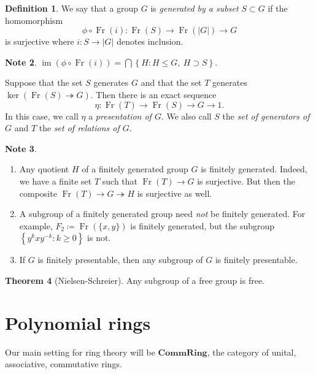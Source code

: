 \documentclass[10pt,letterpaper,cm]{nupset}
\theoremstyle{definition}
\newtheorem{definition}{Definition}[subsection]
\newtheorem{note}[definition]{Note}
\theoremstyle{theorem}
\newtheorem{theorem}[definition]{Theorem}
\theoremstyle{remark}
\newcommand{\1}{\mathbf{1}}
\newcommand{\0}{\vec 0}
\DeclareMathOperator{\im}{im}
\DeclareMathOperator{\Fr}{Fr}
\begin{document}
\begin{definition}
We say that a group $G$ is \textit{generated by a subset $S\subset G$} if the homomorphism $$\phi \circ \Fr(i):\Fr(S) \to \Fr(\lvert{G}\rvert) \to G$$ is surjective where $i: S \to \lvert{G}\rvert$ denotes inclusion.
\end{definition}

\begin{note}
$\im(\phi \circ \Fr(i)) = \bigcap{\left\{H : H \leq G, \ H \supset S\right\}}$.
\end{note}

\medskip

Suppose that the set $S$ generates $G$ and that the set $T$ generates $\ker(\Fr(S) \twoheadrightarrow G)$. Then there is an exact sequence $$\eta :  \Fr(T) \to \Fr(S) \to G \to 1.$$ In this case, we call $\eta$ a \textit{presentation of $G$}. We also call $S$ the \textit{set of generators of $G$} and $T$ the \textit{set of relations of $G$}.



\begin{note} $ $
\begin{enumerate}
\item Any quotient $H$ of a finitely generated group $G$ is finitely generated. Indeed, we have a finite set $T$ such that $\Fr(T) \to G$ is surjective. But then the composite $\Fr(T) \to G \twoheadrightarrow H$ is surjective as well.
\item A subgroup of a finitely generated group need \emph{not} be finitely generated. For example, $F_2\coloneqq \Fr(\{x,y\})$ is finitely generated, but the subgroup $\left\{y^kxy^{-k} : k \geq 0\right\}$ is not.
\item If $G$ is finitely presentable, then any subgroup of $G$ is finitely presentable.
\end{enumerate}  
\end{note}

\begin{theorem}[Nielsen-Schreier]
Any subgroup of a free group is free.
\end{theorem}

\section{Polynomial rings}


Our main setting for ring theory will be $\mathbf{CommRing}$, the category of unital, associative, commutative rings.

\medskip
\end{document}
